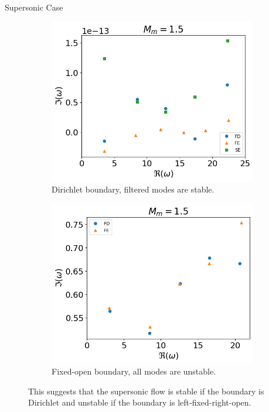 \begin{frame}{Supersonic Case}
  \begin{figure} [H]
    \centering
    \begin{subfigure}{0.45\textwidth}
      \centering
      \includegraphics[width=\linewidth]{figures/numerical-experiments/fixed-fixed/supersonic-v}
      \caption{Dirichlet boundary, filtered modes are stable.}
    \end{subfigure}%
    \begin{subfigure}{0.45\textwidth}
      \centering
      \includegraphics[width=\linewidth]{figures/numerical-experiments/fixed-open/supersonic-v}
      \caption{Fixed-open boundary, all modes are unstable.}
    \end{subfigure}
    \caption{This suggests that the supersonic flow is stable if the boundary is Dirichlet and unstable if the boundary is left-fixed-right-open.}
  \end{figure}
\end{frame}

